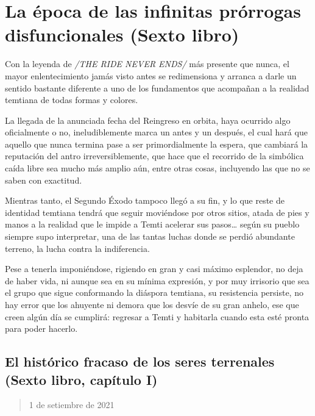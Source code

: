 \documentclass[
]{book}
\begin{document}
\hypertarget{la-uxe9poca-de-las-infinitas-pruxf3rrogas-disfuncionales-sexto-libro}{%
\chapter{La época de las infinitas prórrogas disfuncionales (Sexto libro)}\label{la-uxe9poca-de-las-infinitas-pruxf3rrogas-disfuncionales-sexto-libro}}

Con la leyenda de \emph{/THE RIDE NEVER ENDS/} más presente que nunca, el mayor enlentecimiento jamás visto antes se redimensiona y arranca a darle un sentido bastante diferente a uno de los fundamentos que acompañan a la realidad temtiana de todas formas y colores.

La llegada de la anunciada fecha del Reingreso en orbita, haya ocurrido algo oficialmente o no, ineludiblemente marca un antes y un después, el cual hará que aquello que nunca termina pase a ser primordialmente la espera, que cambiará la reputación del antro irreversiblemente, que hace que el recorrido de la simbólica caída libre sea mucho más amplio aún, entre otras cosas, incluyendo las que no se saben con exactitud.

Mientras tanto, el Segundo Éxodo tampoco llegó a su fin, y lo que reste de identidad temtiana tendrá que seguir moviéndose por otros sitios, atada de pies y manos a la realidad que le impide a Temti acelerar sus pasos\ldots{} según su pueblo siempre supo interpretar, una de las tantas luchas donde se perdió abundante terreno, la lucha contra la indiferencia.

Pese a tenerla imponiéndose, rigiendo en gran y casi máximo esplendor, no deja de haber vida, ni aunque sea en su mínima expresión, y por muy irrisorio que sea el grupo que sigue conformando la diáspora temtiana, su resistencia persiste, no hay error que los ahuyente ni demora que los desvíe de su gran anhelo, ese que creen algún día se cumplirá: regresar a Temti y habitarla cuando esta esté pronta para poder hacerlo.

\hypertarget{el-histuxf3rico-fracaso-de-los-seres-terrenales-sexto-libro-capuxedtulo-i}{%
\section{El histórico fracaso de los seres terrenales (Sexto libro, capítulo I)}\label{el-histuxf3rico-fracaso-de-los-seres-terrenales-sexto-libro-capuxedtulo-i}}

\begin{quote}
1 de setiembre de 2021
\end{quote}
\end{document}
